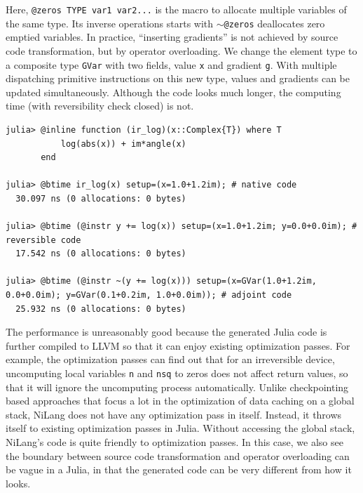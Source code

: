 \documentclass{article}
\newcommand{\<}{\langle}
\renewcommand{\>}{\rangle}
\theoremstyle{definition}\newtheorem{definition}{\textit{Definition}}
\begin{document}
Here, \texttt{@zeros TYPE var1 var2...} is the macro to allocate multiple variables of the same type. Its inverse operations starts with \texttt{$\sim$@zeros} deallocates zero emptied variables.
In practice, ``inserting gradients'' is not achieved by source code transformation, but by operator overloading. We change the element type to a composite type \texttt{GVar} with two fields, value \texttt{x} and gradient \texttt{g}.
With multiple dispatching primitive instructions on this new type, values and gradients can be updated simultaneously.
Although the code looks much longer, the computing time (with reversibility check closed) is not.

\begin{minipage}{.88\textwidth}
\begin{lstlisting}[mathescape=true,caption={Time and allocation to differentiate complex valued log.},label={lst:time-complex}, frame=tlrb]
julia> @inline function (ir_log)(x::Complex{T}) where T
           log(abs(x)) + im*angle(x)
       end

julia> @btime ir_log(x) setup=(x=1.0+1.2im); # native code
  30.097 ns (0 allocations: 0 bytes)

julia> @btime (@instr y += log(x)) setup=(x=1.0+1.2im; y=0.0+0.0im); # reversible code
  17.542 ns (0 allocations: 0 bytes)

julia> @btime (@instr ~(y += log(x))) setup=(x=GVar(1.0+1.2im, 0.0+0.0im); y=GVar(0.1+0.2im, 1.0+0.0im)); # adjoint code
  25.932 ns (0 allocations: 0 bytes)
\end{lstlisting}
\end{minipage}

The performance is unreasonably good because the generated Julia code is further compiled to LLVM so that it can enjoy existing optimization passes.
For example, the optimization passes can find out that for an irreversible device, uncomputing local variables \texttt{n} and \texttt{nsq} to zeros does not affect return values, so that it will ignore the uncomputing process automatically.
Unlike checkpointing based approaches that focus a lot in the optimization of data caching on a global stack, NiLang does not have any optimization pass in itself.
Instead, it throws itself to existing optimization passes in Julia. Without accessing the global stack, NiLang's code is quite friendly to optimization passes.
In this case, we also see the boundary between source code transformation and operator overloading can be vague in a Julia, in that the generated code can be very different from how it looks.
\end{document}
